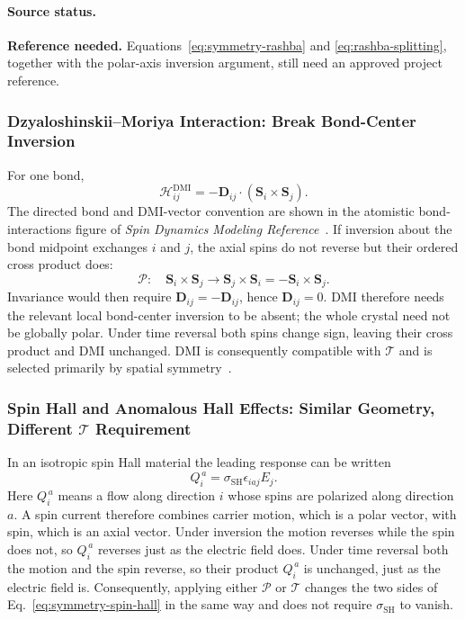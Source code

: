 \paragraph{Source status.}
\textbf{Reference needed.}  Equations~\eqref{eq:symmetry-rashba} and
\eqref{eq:rashba-splitting}, together with the polar-axis inversion argument,
still need an approved project reference.

\subsubsection{Dzyaloshinskii--Moriya Interaction: Break Bond-Center
    Inversion}

For one bond,
\begin{equation}
    \mathcal{H}_{ij}^{\mathrm{DMI}}
    =-\mathbf{D}_{ij}\cdot(\mathbf{S}_i\times\mathbf{S}_j).
    \label{eq:symmetry-dmi-bond}
\end{equation}
The directed bond and DMI-vector convention are shown in the atomistic
bond-interactions figure of \emph{Spin Dynamics Modeling
Reference}~\cite{astro-code}.
If inversion about the bond midpoint exchanges $i$ and $j$, the axial spins do
not reverse but their ordered cross product does:
\begin{equation}
    \mathcal{P}:\quad
    \mathbf{S}_i\times\mathbf{S}_j
    \longrightarrow
    \mathbf{S}_j\times\mathbf{S}_i
    =-\mathbf{S}_i\times\mathbf{S}_j.
\end{equation}
Invariance would then require $\mathbf{D}_{ij}=-\mathbf{D}_{ij}$, hence
$\mathbf{D}_{ij}=0$.  DMI therefore needs the relevant local bond-center
inversion to be absent; the whole crystal need not be globally polar.  Under
time reversal both spins change sign, leaving their cross product and DMI
unchanged.  DMI is consequently compatible with $\mathcal{T}$ and is selected
primarily by spatial symmetry~\cite{astro-code,kong2026spatially}.

\subsubsection{Spin Hall and Anomalous Hall Effects: Similar Geometry,
    Different $\mathcal{T}$ Requirement}

In an isotropic spin Hall material the leading response can be written
\begin{equation}
    Q_i^{\,a}=\sigma_{\mathrm{SH}}\epsilon_{iaj}E_j.
    \label{eq:symmetry-spin-hall}
\end{equation}
Here $Q_i^{\,a}$ means a flow along direction $i$ whose spins are polarized
along direction $a$.  A spin current therefore combines carrier motion, which
is a polar vector, with spin, which is an axial vector.  Under inversion the
motion reverses while the spin does not, so $Q_i^{\,a}$ reverses just as the
electric field does.  Under time reversal both the motion and the spin reverse,
so their product $Q_i^{\,a}$ is unchanged, just as the electric field is.
Consequently, applying either $\mathcal{P}$ or $\mathcal{T}$ changes the two
sides of Eq.~\eqref{eq:symmetry-spin-hall} in the same way and does not require
$\sigma_{\mathrm{SH}}$ to vanish.

